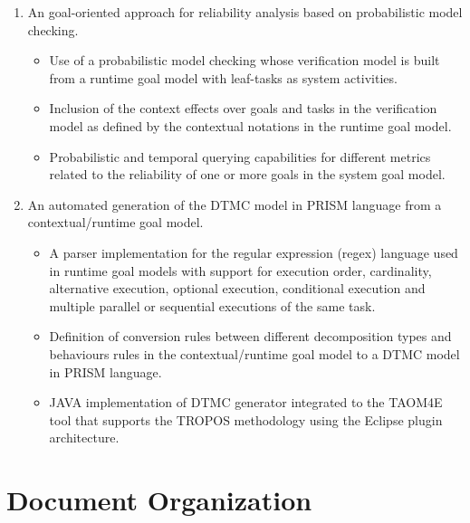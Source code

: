 \begin{enumerate}

\item An goal-oriented approach for reliability analysis based on probabilistic model checking.

\begin{itemize}

\item Use of a probabilistic model checking whose verification model is built from a runtime goal model with leaf-tasks as system activities.
\medskip

\item Inclusion of the context effects over goals and tasks in the verification model as defined by the contextual notations in the runtime goal model.
\medskip

\item Probabilistic and temporal querying capabilities for different metrics related to the reliability of one or more goals in the system goal model.
\end{itemize}
\bigskip

\item An automated generation of the DTMC model in PRISM language from a contextual/runtime goal model.
\begin{itemize}

\item A parser implementation for the regular expression (regex) language used in runtime goal models with support for execution order, cardinality, alternative execution, optional execution, conditional execution and multiple parallel or sequential executions of the same task. 
\medskip

\item Definition of conversion rules between different decomposition types and behaviours rules in the contextual/runtime goal model to a DTMC model in PRISM language.
\medskip

\item JAVA implementation of DTMC generator integrated to the TAOM4E tool that supports the TROPOS methodology using the Eclipse plugin architecture.
\end{itemize}

\end{enumerate}

\section{Document Organization}

